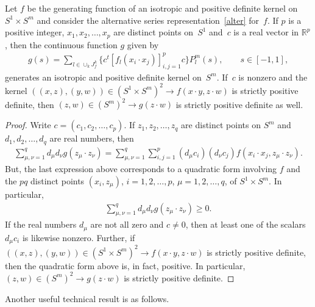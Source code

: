 \begin{Lemma} \label{prelim} Let $f$ be the generating function of an isotropic and positive definite kernel on~\mbox{$S^1 \times S^m$} and consider the alternative series representation~\eqref{alter} for~$f$. If $p$ is a positive integer, $x_1, x_2, \ldots, x_p$ are distinct points on~$S^1$ and~$c$ is a real vector in $\mathbb{R}^p$, then the continuous function $g$ given by
\begin{gather*}g(s)=\sum_{l \in \cup_k J_f^k} \big\{c^t [f_l(x_i \cdot x_j) ]_{i,j=1}^p c\big\} P_l^m(s), \qquad s \in [-1,1],\end{gather*}
generates an isotropic and positive definite kernel on~$S^m$. If~$c$ is nonzero and the kernel $((x,z), (y,w)) \in (S^1 \times S^m)^2 \to f(x \cdot y, z \cdot w)$ is strictly positive definite, then $(z,w)\in (S^m)^2 \to g(z\cdot w)$ is strictly positive definite as well.
\end{Lemma}
\begin{proof} Write $c=(c_1,c_2, \ldots, c_p)$. If $z_1, z_2, \ldots, z_q$ are distinct points on $S^m$ and $d_1, d_2, \ldots, d_q$ are real numbers, then
\begin{gather*}\sum_{\mu,\nu=1}^q d_\mu d_\nu g(z_\mu \cdot z_\nu)=\sum_{\mu,\nu=1}^q \sum_{i,j=1}^p (d_\mu c_i) (d_\nu c_j) f(x_i \cdot x_j,z_\mu \cdot z_\nu).\end{gather*}
But, the last expression above corresponds to a quadratic form involving $f$ and the $pq$ distinct points $(x_i, z_\mu)$, $i=1,2,\ldots,p$, $\mu=1,2,\ldots,q$, of $S^1 \times S^m$. In particular,
\begin{gather*}\sum_{\mu,\nu=1}^q d_\mu d_\nu g(z_\mu \cdot z_\nu)\geq 0.\end{gather*}
If the real numbers $d_\mu$ are not all zero and $c\neq 0$, then at least one of the scalars $d_\mu c_i$ is likewise nonzero. Further, if $((x,z), (y,w)) \in (S^1 \times S^m)^2 \to f(x \cdot y, z \cdot w)$ is strictly positive def\/inite, then the quadratic form above is, in fact, positive. In particular, $(z,w) \in (S^m)^2 \to g(z\cdot w)$ is strictly positive def\/inite.
\end{proof}

Another useful technical result is as follows.

